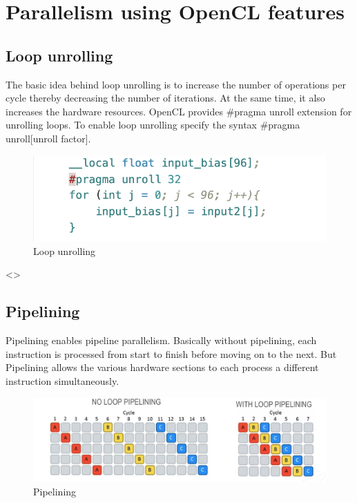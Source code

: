 \section{Parallelism using OpenCL features}
\subsection{Loop unrolling}
The basic idea behind loop unrolling is to increase the number of operations per cycle thereby decreasing the number of iterations. At the same time, it also increases the hardware resources. OpenCL provides \#pragma unroll extension
for unrolling loops. To enable loop unrolling specify the syntax \#pragma unroll[unroll factor].
\begin{figure}[!htb]
    \centering
    \includegraphics[width=\textwidth,height=\textheight,keepaspectratio]{img/Loop_unrolling.png}
    \caption{Loop unrolling}
    \label{Loop unrolling}
\end{figure}
<\newpage>
\subsection{Pipelining}
Pipelining enables pipeline parallelism. Basically without pipelining, each instruction is processed from start to finish before moving on to the next. But Pipelining allows the various hardware sections to each process a different instruction simultaneously.
\begin{figure}[h!]
    \centering
    \includegraphics[scale=0.4]{img/Pipelining.png}
    \caption{Pipelining}
\end{figure}
